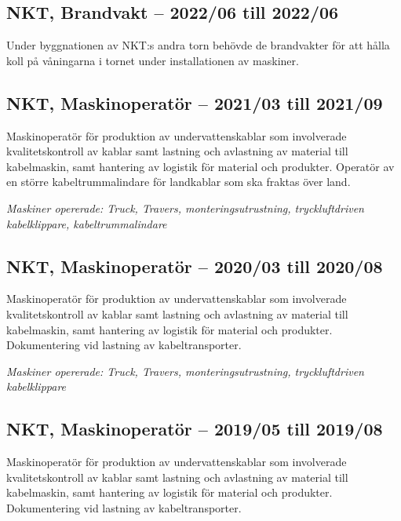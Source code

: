 \subsection*{\textcolor{colorTitelErfarenhet}{NKT, Brandvakt – 2022/06 till 2022/06}}
Under byggnationen av NKT:s andra torn behövde de brandvakter för att hålla koll på våningarna i tornet under installationen av maskiner.

\vspace{15pt} %
\subsection*{\textcolor{colorTitelErfarenhet}{NKT, Maskinoperatör – 2021/03 till 2021/09}}
Maskinoperatör för produktion av undervattenskablar som involverade kvalitetskontroll av kablar samt lastning och avlastning av material till kabelmaskin, samt hantering av logistik för material och produkter. Operatör av en större kabeltrummalindare för landkablar som ska fraktas över land.

\vspace{5pt}\textit{Maskiner opererade: Truck, Travers, monteringsutrustning, tryckluftdriven kabelklippare, kabeltrummalindare}

\vspace{15pt} %
\subsection*{\textcolor{colorTitelErfarenhet}{NKT, Maskinoperatör – 2020/03 till 2020/08}}
Maskinoperatör för produktion av undervattenskablar som involverade kvalitetskontroll av kablar samt lastning och avlastning av material till kabelmaskin, samt hantering av logistik för material och produkter. Dokumentering vid lastning av kabeltransporter.

\vspace{5pt}\textit{Maskiner opererade: Truck, Travers, monteringsutrustning, tryckluftdriven kabelklippare}

\vspace{15pt} %
\subsection*{\textcolor{colorTitelErfarenhet}{NKT, Maskinoperatör – 2019/05 till 2019/08}}
Maskinoperatör för produktion av undervattenskablar som involverade kvalitetskontroll av kablar samt lastning och avlastning av material till kabelmaskin, samt hantering av logistik för material och produkter. Dokumentering vid lastning av kabeltransporter.

